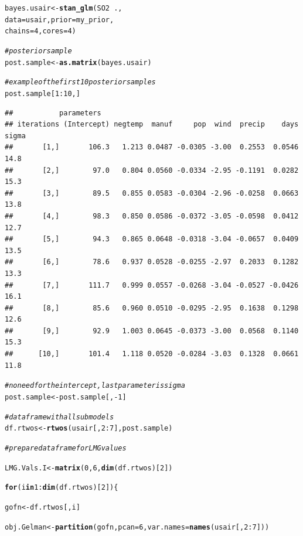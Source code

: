\documentclass[11pt,a4paper,twoside]{book}\usepackage[]{graphicx}\usepackage[]{color}
\makeatletter
\newcommand{\hlnum}[1]{\textcolor[rgb]{0.686,0.059,0.569}{#1}}%
\newcommand{\hlcom}[1]{\textcolor[rgb]{0.678,0.584,0.686}{\textit{#1}}}%
\newcommand{\hlopt}[1]{\textcolor[rgb]{0,0,0}{#1}}%
\newcommand{\hlstd}[1]{\textcolor[rgb]{0.345,0.345,0.345}{#1}}%
\newcommand{\hlkwa}[1]{\textcolor[rgb]{0.161,0.373,0.58}{\textbf{#1}}}%
\newcommand{\hlkwb}[1]{\textcolor[rgb]{0.69,0.353,0.396}{#1}}%
\newcommand{\hlkwc}[1]{\textcolor[rgb]{0.333,0.667,0.333}{#1}}%
\newcommand{\hlkwd}[1]{\textcolor[rgb]{0.737,0.353,0.396}{\textbf{#1}}}%
\newenvironment{kframe}{%
 \def\at@end@of@kframe{}%
 \ifinner\ifhmode%
  \def\at@end@of@kframe{\end{minipage}}%
  \begin{minipage}{\columnwidth}%
 \fi\fi%
 \def\FrameCommand##1{\hskip\@totalleftmargin \hskip-\fboxsep
 \colorbox{shadecolor}{##1}\hskip-\fboxsep
     \hskip-\linewidth \hskip-\@totalleftmargin \hskip\columnwidth}%
 \MakeFramed {\advance\hsize-\width
   \@totalleftmargin\z@ \linewidth\hsize
   \@setminipage}}%
 {\par\unskip\endMakeFramed%
 \at@end@of@kframe}
\newenvironment{knitrout}{}{} %
\makeatother
\begin{document}
\begin{knitrout}
\begin{kframe}
\begin{alltt}
\hlstd{bayes.usair} \hlkwb{<-} \hlkwd{stan_glm}\hlstd{(SO2} \hlopt{~} \hlstd{. ,}
                  \hlkwc{data} \hlstd{= usair,} \hlkwc{prior} \hlstd{= my_prior,}
                  \hlkwc{chains} \hlstd{=} \hlnum{4}\hlstd{,} \hlkwc{cores} \hlstd{=} \hlnum{4}\hlstd{)}

\hlcom{#posterior sample}
\hlstd{post.sample} \hlkwb{<-} \hlkwd{as.matrix}\hlstd{(bayes.usair)}

\hlcom{#example of the first 10 posterior samples}
\hlstd{post.sample[}\hlnum{1}\hlopt{:}\hlnum{10}\hlstd{,]}
\end{alltt}
\begin{verbatim}
##           parameters
## iterations (Intercept) negtemp  manuf     pop  wind  precip    days sigma
##       [1,]       106.3   1.213 0.0487 -0.0305 -3.00  0.2553  0.0546  14.8
##       [2,]        97.0   0.804 0.0560 -0.0334 -2.95 -0.1191  0.0282  15.3
##       [3,]        89.5   0.855 0.0583 -0.0304 -2.96 -0.0258  0.0663  13.8
##       [4,]        98.3   0.850 0.0586 -0.0372 -3.05 -0.0598  0.0412  12.7
##       [5,]        94.3   0.865 0.0648 -0.0318 -3.04 -0.0657  0.0409  13.5
##       [6,]        78.6   0.937 0.0528 -0.0255 -2.97  0.2033  0.1282  13.3
##       [7,]       111.7   0.999 0.0557 -0.0268 -3.04 -0.0527 -0.0426  16.1
##       [8,]        85.6   0.960 0.0510 -0.0295 -2.95  0.1638  0.1298  12.6
##       [9,]        92.9   1.003 0.0645 -0.0373 -3.00  0.0568  0.1140  15.3
##      [10,]       101.4   1.118 0.0520 -0.0284 -3.03  0.1328  0.0661  11.8
\end{verbatim}
\begin{alltt}
\hlcom{#no need for the intercept, last parameter is sigma}
\hlstd{post.sample} \hlkwb{<-} \hlstd{post.sample[,}\hlopt{-}\hlnum{1}\hlstd{]}

\hlcom{#data frame with all submodels}
\hlstd{df.rtwos} \hlkwb{<-}\hlkwd{rtwos}\hlstd{(usair[,}\hlnum{2}\hlopt{:}\hlnum{7}\hlstd{], post.sample)}


\hlcom{# prepare data frame for LMG values}

\hlstd{LMG.Vals.I}\hlkwb{<-}\hlkwd{matrix}\hlstd{(}\hlnum{0}\hlstd{,} \hlnum{6}\hlstd{,} \hlkwd{dim}\hlstd{(df.rtwos)[}\hlnum{2}\hlstd{])}

\hlkwa{for}\hlstd{(i} \hlkwa{in} \hlnum{1}\hlopt{:}\hlkwd{dim}\hlstd{(df.rtwos)[}\hlnum{2}\hlstd{])\{}

  \hlstd{gofn}\hlkwb{<-}\hlstd{df.rtwos[,i]}

  \hlstd{obj.Gelman}\hlkwb{<-}\hlkwd{partition}\hlstd{(gofn,} \hlkwc{pcan} \hlstd{=} \hlnum{6}\hlstd{,} \hlkwc{var.names} \hlstd{=} \hlkwd{names}\hlstd{(usair[,}\hlnum{2}\hlopt{:}\hlnum{7}\hlstd{]))}


\end{alltt}
\end{kframe}
\end{knitrout}
\end{document}
